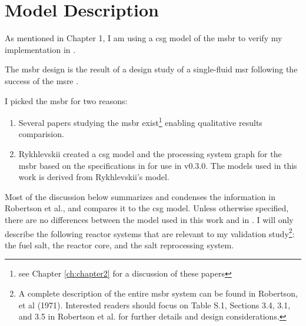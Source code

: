 \chapter{Model Description}
\label{ch:chapter4}
As mentioned in Chapter 1, I am using a \Gls{csg} model of the \Gls{msbr}
\cite{robertson_conceptual_1971} to verify my \OpenMC implementation in
\SaltProc.

The \Gls{msbr} design is the result of a design study of a single-fluid
\Gls{msr} following the success of the \Gls{msre}
\cite{haubenreich_experience_1970}\cite{rosenthal_history_1970}.

I picked the \Gls{msbr} for two reasons:
\begin{enumerate}
    \item Several papers studying the \Gls{msbr} exist\footnote{see Chapter
    \ref{ch:chapter2} for a discussion of these papers} enabling qualitative
    results comparision.
    \item Rykhlevskii created a \SerpentTWO \Gls{csg} model and the processing
    system graph for the \Gls{msbr} based on the specifications in
    \cite{robertson_conceptual_1971} for use in \SaltProc
    v0.3.0\cite{rykhlevskii_fuel_2020}. The models used in this work is derived
    from Rykhlevskii's model.
\end{enumerate}

Most of the discussion below summarizes and condenses the information in
Robertson et al., and compares it to the \Gls{csg} model. Unless otherwise
specified, there are no differences between the model used in this work and in
\cite{rykhlevskii_fuel_2020}. I will only describe the following reactor systems
that are relevant to my validation study\footnote{A complete description of the
entire \Gls{msbr} system can be found in Robertson, et al
(1971)\cite{robertson_conceptual_1971}. Interested readers should focus on Table
S.1, Sections 3.4, 3.1, and 3.5 in Robertson et al. for further details and
design considerations.}:
the fuel salt, the reactor core, and the salt reprocessing system.


